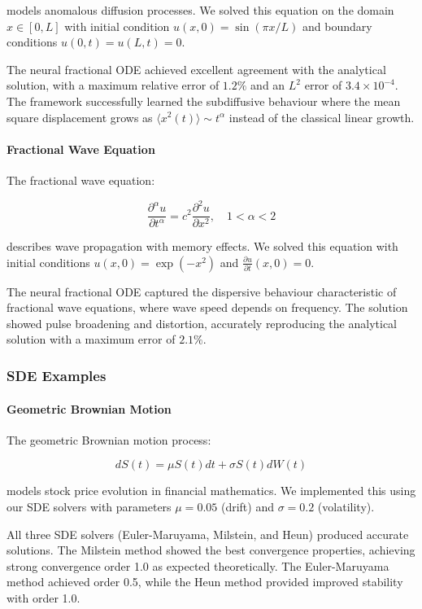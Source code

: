 models anomalous diffusion processes. We solved this equation on the domain $x \in [0, L]$ with initial condition $u(x,0) = \sin(\pi x/L)$ and boundary conditions $u(0,t) = u(L,t) = 0$.

The neural fractional ODE achieved excellent agreement with the analytical solution, with a maximum relative error of $1.2\%$ and an $L^2$ error of $3.4 \times 10^{-4}$. The framework successfully learned the subdiffusive behaviour where the mean square displacement grows as $\langle x^2(t) \rangle \sim t^{\alpha}$ instead of the classical linear growth.

\paragraph{Fractional Wave Equation}
The fractional wave equation:

\begin{equation}
\frac{\partial^{\alpha} u}{\partial t^{\alpha}} = c^2 \frac{\partial^2 u}{\partial x^2}, \quad 1 < \alpha < 2
\end{equation}

describes wave propagation with memory effects. We solved this equation with initial conditions $u(x,0) = \exp(-x^2)$ and $\frac{\partial u}{\partial t}(x,0) = 0$.

The neural fractional ODE captured the dispersive behaviour characteristic of fractional wave equations, where wave speed depends on frequency. The solution showed pulse broadening and distortion, accurately reproducing the analytical solution with a maximum error of $2.1\%$.

\subsubsection{SDE Examples}

\paragraph{Geometric Brownian Motion}
The geometric Brownian motion process:

\begin{equation}
dS(t) = \mu S(t) dt + \sigma S(t) dW(t)
\end{equation}

models stock price evolution in financial mathematics. We implemented this using our SDE solvers with parameters $\mu = 0.05$ (drift) and $\sigma = 0.2$ (volatility).

All three SDE solvers (Euler-Maruyama, Milstein, and Heun) produced accurate solutions. The Milstein method showed the best convergence properties, achieving strong convergence order 1.0 as expected theoretically. The Euler-Maruyama method achieved order 0.5, while the Heun method provided improved stability with order 1.0.

